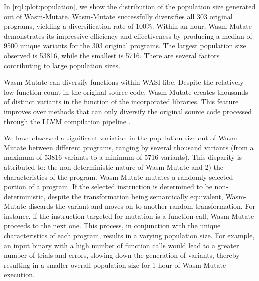 \documentclass[a4paper,fleqn]{cas-dc}
\newcommand*\badge[1]{ \colorbox{red}{\color{white}#1}}
\newcommand{\tool}{{\sc Wasm-Mutate}\xspace}
\newcommand{\todo}[1]{%
\refstepcounter{todo}
\noindent\textbf{\badge{TODO}} {\color{red}#1}
\addcontentsline{td}{todo}
{\color{red}\thesection.\thetodo\xspace #1}}
\begin{document}
In \autoref{rq1:plot:population}, we show the distribution of the population size generated out of \tool.
\tool successfully diversifies all 303 original programs, yielding a diversification rate of 100\%. 
Within an hour, \tool demonstrates its impressive efficiency and effectiveness by producing a median of 9500 unique variants for the 303 original programs.
The largest population size observed is 53816, while the smallest is 5716.
There are several factors contributing to large population sizes. 

\tool can diversify functions within WASI-libc. 
Despite the relatively low function count in the original source code,  \tool creates thousands of distinct variants in the function of the incorporated libraries. 
This feature improves over methods that can only diversify the original source code processed through the LLVM compilation pipeline \cite{arteaga2020crow}. 



We have observed a significant variation in the population size out of \tool between different programs, ranging by several thousand variants (from a maximum of 53816 variants to a minimum of 5716 variants).
This disparity is attributed to:
the non-deterministic nature of \tool and 2) the characteristics of the program. 
\tool mutates a randomly selected portion of a program. 
If the selected instruction is determined to be non-deterministic, despite the transformation being semantically equivalent, \tool discards the variant and moves on to another random transformation.
For instance, if the instruction targeted for mutation is a function call, \tool proceeds to the next one.
This process, in conjunction with the unique characteristics of each program, results in a varying population size. 
For example, an input binary with a high number of function calls would lead to a greater number of trials and errors, slowing down the generation of variants, thereby resulting in a smaller overall population size for 1 hour of \tool execution.

\end{document}
